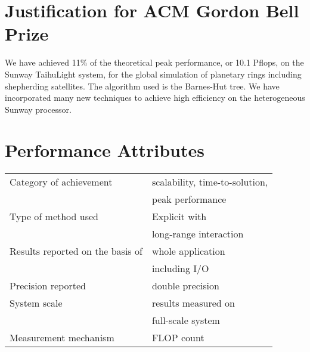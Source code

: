 \documentclass[sigconf]{acmart}
\begin{document}




\maketitle

\section{Justification for ACM Gordon Bell Prize}


We have achieved 11\% of the theoretical peak performance, or 10.1
Pflops, on the Sunway TaihuLight system, for the global simulation of
planetary rings including shepherding satellites. The algorithm used
is the Barnes-Hut tree. We have incorporated many new
techniques to achieve high efficiency on the heterogeneous Sunway
processor.

\section{Performance Attributes}

  \begin{tabular}{ll}
    \toprule
    Category of achievement&  scalability, time-to-solution,\\
                           &peak performance\\
    Type of method used & Explicit with\\
                        &long-range interaction\\    
    Results reported on the basis of&  whole application\\
                                   &including I/O\\
     Precision reported &  double precision\\
     System scale & results measured on \\
                  &full-scale system\\
    Measurement mechanism &   FLOP count\\

  \bottomrule
\end{tabular}
\end{document}
